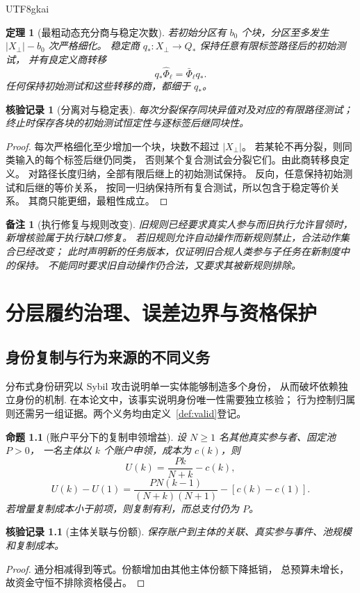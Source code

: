 \documentclass[12pt,a4paper,openany]{report}
\newtheorem{theorem}{定理}[chapter]
\newtheorem{proposition}{命题}[chapter]
\newtheorem{remark}{备注}[chapter]
\newtheorem{Certificate}{核验记录}[chapter]
\begin{document}
\begin{CJK*}{UTF8}{gkai}
\begin{theorem}[最粗动态充分商与稳定次数]
\label{thm:dynamic}
若初始分区有 \(b_0\) 个块，分区至多发生
\(|X_\bot|-b_0\) 次严格细化。
稳定商 \(q_*:X_\bot\to Q_*\) 保持任意有限标签路径后的初始测试，
并有良定义商转移
\[
q_*\widehat\Phi_\ell=\bar\Phi_\ell q_*.
\]
任何保持初始测试和这些转移的商，都细于 \(q_*\)。
\end{theorem}
\begin{Certificate}[分离对与稳定表]
每次分裂保存同块异值对及对应的有限路径测试；
终止时保存各块的初始测试恒定性与逐标签后继同块性。
\end{Certificate}
\begin{proof}
每次严格细化至少增加一个块，块数不超过 \(|X_\bot|\)。
若某轮不再分裂，则同类输入的每个标签后继仍同类，
否则某个复合测试会分裂它们。由此商转移良定义。
对路径长度归纳，全部有限后继上的初始测试保持。
反向，任意保持初始测试和后继的等价关系，
按同一归纳保持所有复合测试，所以包含于稳定等价关系。
其商只能更细，最粗性成立。
\end{proof}

\begin{remark}[执行修复与规则改变]
旧规则已经要求真实人参与而旧执行允许冒领时，新增核验属于执行缺口修复。
若旧规则允许自动操作而新规则禁止，合法动作集合已经改变；
此时声明新的任务版本，仅证明旧合规人类参与子任务在新制度中的保持。
不能同时要求旧自动操作仍合法，又要求其被新规则排除。
\end{remark}

\chapter{分层履约治理、误差边界与资格保护}
\label{ch:security}

\section{身份复制与行为来源的不同义务}
分布式身份研究以 Sybil 攻击说明单一实体能够制造多个身份，
从而破坏依赖独立身份的机制\cite{Douceur}.
在本论文中，该事实说明身份唯一性需要独立核验；
行为控制归属则还需另一组证据。两个义务均由定义~\ref{def:valid}登记。

\begin{proposition}[账户平分下的复制申领增益]
\label{prop:sybil}
设 \(N\ge1\) 名其他真实参与者、固定池 \(P>0\)，
一名主体以 \(k\) 个账户申领，成本为 \(c(k)\)，则
\[
U(k)=\frac{Pk}{N+k}-c(k),
\]
\[
U(k)-U(1)=
\frac{PN(k-1)}{(N+k)(N+1)}-[c(k)-c(1)].
\]
若增量复制成本小于前项，则复制有利，而总支付仍为 \(P\)。
\end{proposition}
\begin{Certificate}[主体关联与份额]
保存账户到主体的关联、真实参与事件、池规模和复制成本。
\end{Certificate}
\begin{proof}
通分相减得到等式。份额增加由其他主体份额下降抵销，
总预算未增长，故资金守恒不排除资格侵占。
\end{proof}


\end{CJK*}
\end{document}
